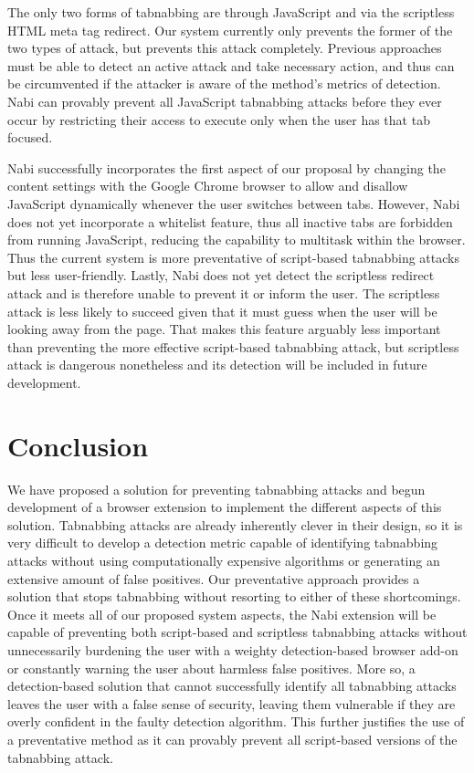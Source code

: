 \documentclass[12pt]{article}
\begin{document}
\begin{doublespace}
The only two forms of tabnabbing are through JavaScript and via the scriptless HTML meta tag redirect. Our system currently only prevents the former of the two types of attack, but prevents this attack completely. Previous approaches must be able to detect an active attack and take necessary action, and thus can be circumvented if the attacker is aware of the method's metrics of detection. Nabi can provably prevent all JavaScript tabnabbing attacks before they ever occur by restricting their access to execute only when the user has that tab focused.

Nabi successfully incorporates the first aspect of our proposal by changing the content settings with the Google Chrome browser to allow and disallow JavaScript dynamically whenever the user switches between tabs. However, Nabi does not yet incorporate a whitelist feature, thus all inactive tabs are forbidden from running JavaScript, reducing the capability to multitask within the browser. Thus the current system is more preventative of script-based tabnabbing attacks but less user-friendly. Lastly, Nabi does not yet detect the scriptless redirect attack and is therefore unable to prevent it or inform the user. The scriptless attack is less likely to succeed given that it must guess when the user will be looking away from the page. That makes this feature arguably less important than preventing the more effective script-based tabnabbing attack, but scriptless attack is dangerous nonetheless and its detection will be included in future development.

\section{Conclusion}

We have proposed a solution for preventing tabnabbing attacks and begun development of a browser extension to implement the different aspects of this solution. Tabnabbing attacks are already inherently clever in their design, so it is very difficult to develop a detection metric capable of identifying tabnabbing attacks without using computationally expensive algorithms or generating an extensive amount of false positives. Our preventative approach provides a solution that stops tabnabbing without resorting to either of these shortcomings. Once it meets all of our proposed system aspects, the Nabi extension will be capable of preventing both script-based and scriptless tabnabbing attacks without unnecessarily burdening the user with a weighty detection-based browser add-on or constantly warning the user about harmless false positives. More so, a detection-based solution that cannot successfully identify all tabnabbing attacks leaves the user with a false sense of security, leaving them vulnerable if they are overly confident in the faulty detection algorithm. This further justifies the use of a preventative method as it can provably prevent all script-based versions of the tabnabbing attack.

\end{doublespace}




\end{document}
